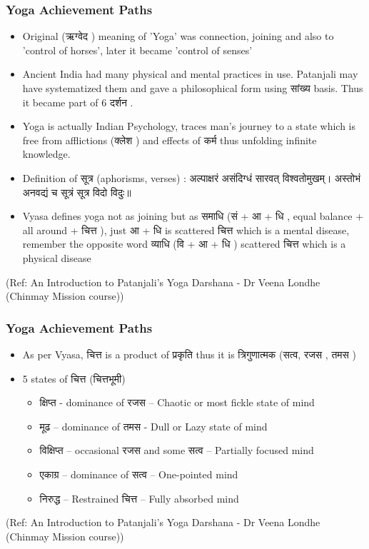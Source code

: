 \begin{frame}[fragile]\frametitle{Yoga Achievement Paths}

\begin{itemize}
\item Original (ऋग्वेद ) meaning of 'Yoga' was connection, joining and also to 'control of horses', later it became 'control of senses'
\item Ancient India had many physical and mental practices in use. Patanjali may have systematized them and gave a philosophical form using सांख्य  basis. Thus it became part of 6 दर्शन .
\item Yoga is actually Indian Psychology, traces man's journey to a state which is free from afflictions (क्लेश ) and effects of कर्म  thus unfolding infinite knowledge.
\item Definition of सूत्र (aphorisms, verses) : अल्पाक्षरं असंदिग्धं सारवत्‌ विश्वतोमुखम्‌। अस्तोभं अनवद्यं च सूत्रं सूत्र विदो विदुः॥
\item Vyasa defines yoga not as joining but as समाधि  (सं + आ  + धि ,  equal balance + all around +  चित्त ), just आ  + धि is scattered चित्त which is a mental disease, remember the opposite word व्याधि (वि + आ + धि ) scattered चित्त which is a physical disease
\end{itemize}
  
  \tiny{(Ref: An Introduction to Patanjali’s Yoga Darshana - Dr Veena Londhe (Chinmay Mission course))}

\end{frame}

\begin{frame}[fragile]\frametitle{Yoga Achievement Paths}

\begin{itemize}
\item As per Vyasa, चित्त is a product of प्रकृति  thus it is त्रिगुणात्मक (सत्व, रजस , तमस )
\item 5 states of चित्त (चित्तभूमी)
	\begin{itemize}
	\item क्षिप्त  - dominance of  रजस – Chaotic or most fickle state of mind
	\item मूढ  – dominance of  तमस - Dull or Lazy state of mind
	\item विक्षिप्त  – occasional रजस and some सत्व – Partially focused mind
	\item एकाग्र   – dominance of  सत्व – One-pointed mind
	\item निरुद्ध  – Restrained  चित्त – Fully absorbed mind
	\end{itemize}
\end{itemize}
  
  \tiny{(Ref: An Introduction to Patanjali’s Yoga Darshana - Dr Veena Londhe (Chinmay Mission course))}

\end{frame}

